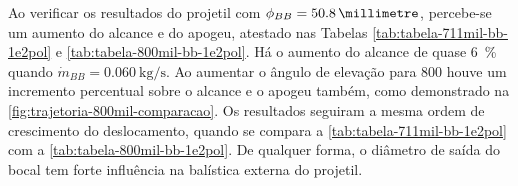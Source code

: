 Ao verificar os resultados do projetil com \(\phi_{BB} = \qty{50,8}{\millimetre}\), percebe-se um aumento do alcance e do apogeu, atestado nas Tabelas \ref{tab:tabela-711mil-bb-1e2pol} e \ref{tab:tabela-800mil-bb-1e2pol}. Há o aumento do alcance de quase \qty{6}{\percent} quando \(\Dot{m}_{BB} = \qty{0,060}{\kilogram\per\second}\). Ao aumentar o ângulo de elevação para \qty{800}{\milliradian} houve um incremento percentual sobre o alcance e o apogeu também, como demonstrado na \autoref{fig:trajetoria-800mil-comparacao}. Os resultados seguiram a mesma ordem de crescimento do deslocamento, quando se compara a \autoref{tab:tabela-711mil-bb-1e2pol} com a \autoref{tab:tabela-800mil-bb-1e2pol}. De qualquer forma, o diâmetro de saída do bocal tem forte influência na balística externa do projetil.